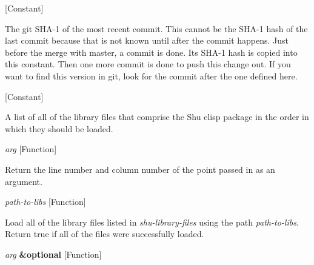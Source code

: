 \vspace{1em}
\noindent
{}
\usebox{\funcname}
 \hfill [Constant]

\begin{doc-string}
The git SHA-1 of the most recent commit.  This cannot be the SHA-1 hash of
the last commit because that is not known until after the commit happens.  Just
before the merge with master, a commit is done.  Its SHA-1 hash is copied into
this constant.  Then one more commit is done to push this change out.  If you
want to find this version in git, look for the commit after the one defined
here.
\end{doc-string}

\vspace{1em}
\noindent
{}
\usebox{\funcname}
 \hfill [Constant]

\begin{doc-string}
A list of all of the library files that comprise the Shu elisp package in the
order in which they should be loaded.
\end{doc-string}

\vspace{1em}
\noindent
{}
\usebox{\funcname}\emph{arg}
 \hfill [Function]

\begin{doc-string}
Return the line number and column number of the point passed in as an argument.
\end{doc-string}

\vspace{1em}
\noindent
{}
\usebox{\funcname}\emph{path-to-libs}
 \hfill [Function]

\begin{doc-string}
Load all of the library files listed in \emph{shu-library-files} using the path
\emph{path-to-libs}.  Return true if all of the files were successfully loaded.
\end{doc-string}

\vspace{1em}
\noindent
{}
\usebox{\funcname}\emph{arg} \textbf{\&optional}
 \hfill [Function]
\hspace*{\wd\funcname}

